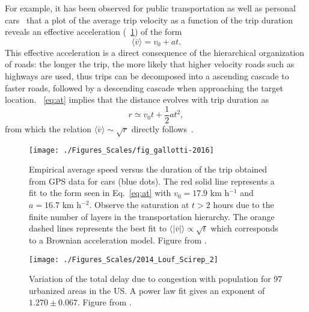 For example, it has been observed for public transportation as well as personal cars~\cite{gallotti_2016_stochastic} that a plot of the average trip velocity as a function of the trip duration reveals an effective acceleration (\figurename~\ref{fig:scales_gallotti}) of the form 
\begin{equation}
\langle\overline{v}\rangle = v_0+at.
\label{eq:at}
\end{equation}
This effective acceleration is a direct consequence of the hierarchical organization of roads: the longer the trip, the more likely that higher velocity roads such as highways are used, thus trips can be decomposed into a ascending cascade to faster roads, followed by a descending cascade when approaching the target location. \equationname~\eqref{eq:at} implies that the distance evolves with trip duration as 
\begin{equation}
r\simeq v_0t+\frac{1}{2}at^2,
\label{eq:dt2}
\end{equation}
from which the relation $\langle\overline{v}\rangle \sim \sqrt{r}$ directly follows~\cite{varga_2016_further}.
\begin{figure}[t!]
  \centering
\texttt{[image: ./Figures\_Scales/fig\_gallotti-2016]}
  \caption{Empirical average speed versus the duration of the trip obtained from GPS data for cars (blue dots). The red solid line represents a fit to the form seen in Eq.~\eqref{eq:at} with $v_0 = 17.9$ km h$^{-1}$ and $a = 16.7$ km h$^{-2}$.  Observe the saturation at $t > 2$ hours due to the finite number of layers in the transportation hierarchy. The orange dashed lines represents the best fit to $\langle \mid \overline{v} \mid \rangle \propto \sqrt{t}$ which corresponds to a Brownian acceleration model. Figure from \cite{gallotti_2016_stochastic}.}
\label{fig:scales_gallotti}
\end{figure}

\begin{figure}[t!]
  \centering
\texttt{[image: ./Figures\_Scales/2014\_Louf\_Scirep\_2]}
  \caption{Variation of the total delay due to congestion with population for 97 urbanized areas in the US. A power law fit gives an exponent  of $1.270 \pm 0.067$. Figure from \cite{louf_2014_how}.} 
\label{fig:louf_congestion}
\end{figure}


